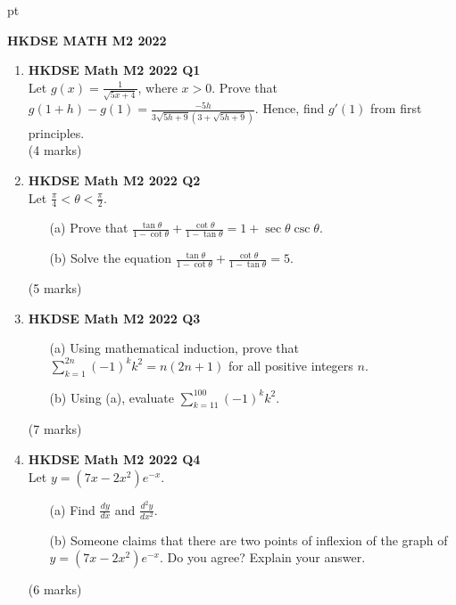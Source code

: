 \documentclass[12pt]{article}
\begin{document}
 pt
\begin{center}
	{\large \bf HKDSE MATH M2 2022}\\
	\vspace{2 mm}

\end{center}
\vspace{0.05cm}

\begin{enumerate}
	\item \textbf{HKDSE Math M2 2022 Q1}\\
	Let $\displaystyle g(x) = \frac{1}{\sqrt{5x+4}}$, where $x > 0$. Prove that $\displaystyle g(1+h)-g(1) = \frac{-5h}{3\sqrt{5h+9}(3+\sqrt{5h+9})}$. Hence, find $g'(1)$ from first principles. \\
	(4 marks)

	\item \textbf{HKDSE Math M2 2022 Q2}\\
	Let $\displaystyle \frac{\pi}{4} < \theta < \frac{\pi}{2}$.
	\begin{enumerate}
		\item [(a)] Prove that $\displaystyle \frac{\tan{\theta}}{1-\cot{\theta}} + \frac{\cot{\theta}}{1-\tan{\theta}} = 1+\sec{\theta}\csc{\theta}$.
		\item [(b)] Solve the equation $\displaystyle \frac{\tan{\theta}}{1-\cot{\theta}} + \frac{\cot{\theta}}{1-\tan{\theta}} = 5$.
	\end{enumerate}
	(5 marks)

	\item \textbf{HKDSE Math M2 2022 Q3}
	\begin{enumerate}
		\item [(a)]Using mathematical induction, prove that $\displaystyle \sum_{k = 1}^{2n} (-1)^k k^2 = n(2n+1)$ for all positive integers $n$.
		\item [(b)] Using (a), evaluate $\displaystyle \sum_{k = 11}^{100} (-1)^k k^2$. 
	\end{enumerate}
	(7 marks)


	\item \textbf{HKDSE Math M2 2022 Q4}\\
	Let $y = (7x - 2x^2)e^{-x}$.
	\begin{enumerate}
		\item[(a)]
		Find $\displaystyle \frac{dy}{dx}$ and $\displaystyle \frac{d^2y}{dx^2}$. 
		\item[(b)]
		Someone claims that there are two points of inflexion of the graph of $y = (7x - 2x^2)e^{-x}$. Do you agree? Explain your answer. 
	\end{enumerate}
	(6 marks)


\end{enumerate}
\end{document}

